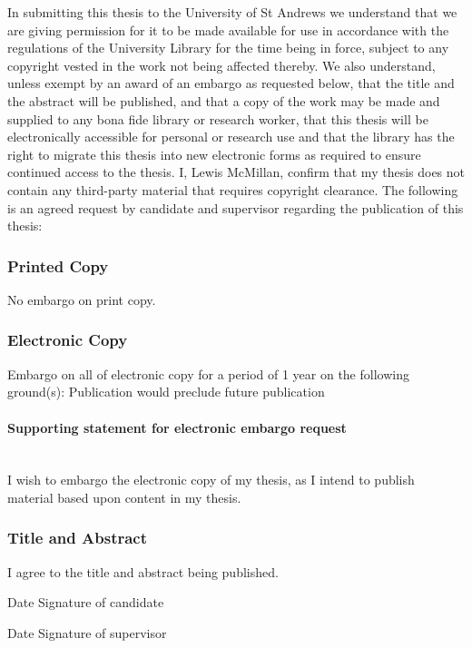 \documentclass[10pt,a4paper,twoside]{book}
\begin{document}
In submitting this thesis to the University of St Andrews we understand that we are giving permission for it to be made available for use in accordance with the regulations of the University Library for the time being in force, subject to any copyright vested in the work not being affected thereby. We also understand, unless exempt by an award of an embargo as requested below, that the title and the abstract will be published, and that a copy of the work may be made and supplied to any bona fide library or research worker, that this thesis will be electronically accessible for personal or research use and that the library has the right to migrate this thesis into new electronic forms as required to ensure continued access to the thesis.
I, Lewis McMillan, confirm that my thesis does not contain any third-party material that requires copyright clearance.
The following is an agreed request by candidate and supervisor regarding the publication of this thesis:

\subsubsection*{Printed Copy}
No embargo on print copy.

\subsubsection*{Electronic Copy}
Embargo on all of electronic copy for a period of 1 year on the following ground(s):
Publication would preclude future publication 
\paragraph*{Supporting statement for electronic embargo request}\hspace*{0pt}\\
I wish to embargo the electronic copy of my thesis, as I intend to publish material based upon content in my thesis.

\subsubsection*{Title and Abstract}
I agree to the title and abstract being published.

\medskip

Date\dotfill \hspace{1cm} Signature of candidate \dotfill

\medskip

Date\dotfill \hspace{1cm} Signature of supervisor \dotfill
\end{document}
